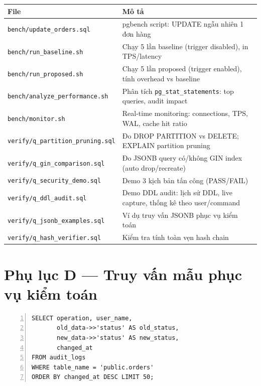 \begin{center}
\label{tab:benchmark-scripts}
\begin{tabularx}{\textwidth}{l>{\raggedright\arraybackslash}X}
\toprule
\textbf{File} & \textbf{Mô tả} \\
\midrule
\texttt{bench/update\_orders.sql} & pgbench script: UPDATE ngẫu nhiên 1 đơn hàng \\
\texttt{bench/run\_baseline.sh} & Chạy 5 lần baseline (trigger disabled), in TPS/latency \\
\texttt{bench/run\_proposed.sh} & Chạy 5 lần proposed (trigger enabled), tính overhead vs baseline \\
\texttt{bench/analyze\_performance.sh} & Phân tích \texttt{pg\_stat\_statements}: top queries, audit impact \\
\texttt{bench/monitor.sh} & Real-time monitoring: connections, TPS, WAL, cache hit ratio \\
\texttt{verify/q\_partition\_pruning.sql} & Đo DROP PARTITION vs DELETE; EXPLAIN partition pruning \\
\texttt{verify/q\_gin\_comparison.sql} & Đo JSONB query có/không GIN index (auto drop/recreate) \\
\texttt{verify/q\_security\_demo.sql} & Demo 3 kịch bản tấn công (PASS/FAIL) \\
\texttt{verify/q\_ddl\_audit.sql} & Demo DDL audit: lịch sử DDL, live capture, thống kê theo user/command \\
\texttt{verify/q\_jsonb\_examples.sql} & Ví dụ truy vấn JSONB phục vụ kiểm toán \\
\texttt{verify/q\_hash\_verifier.sql} & Kiểm tra tính toàn vẹn hash chain \\
\bottomrule
\end{tabularx}
\end{center}

\section*{Phụ lục D --- Truy vấn mẫu phục vụ kiểm toán}

\begin{center}
\label{lst:query-d1}
\begin{Verbatim}[frame=single, fontsize=\scriptsize, numbers=left, numbersep=5pt, breaklines]
SELECT operation, user_name,
       old_data->>'status' AS old_status,
       new_data->>'status' AS new_status,
       changed_at
FROM audit_logs
WHERE table_name = 'public.orders'
ORDER BY changed_at DESC LIMIT 50;
\end{Verbatim}
\end{center}

